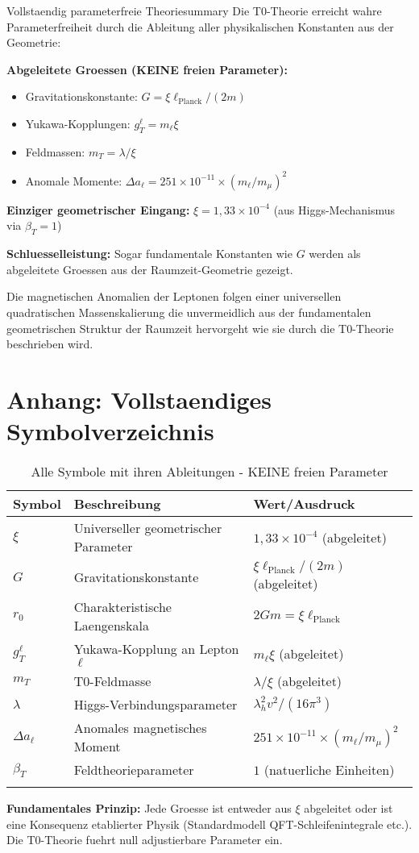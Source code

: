 \documentclass[12pt,a4paper]{article}
\begin{document}
	\begin{keyresult}{Vollstaendig parameterfreie Theorie}{summary}
		Die T0-Theorie erreicht wahre Parameterfreiheit durch die Ableitung aller physikalischen Konstanten aus der Geometrie:
		
		\textbf{Abgeleitete Groessen (KEINE freien Parameter):}
		\begin{itemize}
			\item Gravitationskonstante: $G = \xi \ell_{\text{Planck}}/(2m)$
			\item Yukawa-Kopplungen: $g_T^\ell = m_\ell \xi$  
			\item Feldmassen: $m_T = \lambda/\xi$
			\item Anomale Momente: $\Delta a_\ell = 251 \times 10^{-11} \times (m_\ell/m_\mu)^2$
		\end{itemize}
		
		\textbf{Einziger geometrischer Eingang:}
		$\xi = 1{,}33 \times 10^{-4}$ (aus Higgs-Mechanismus via $\beta_T = 1$)
		
		\textbf{Schluesselleistung:} Sogar fundamentale Konstanten wie $G$ werden als abgeleitete Groessen aus der Raumzeit-Geometrie gezeigt.
	\end{keyresult}
	
	Die magnetischen Anomalien der Leptonen folgen einer universellen quadratischen Massenskalierung die unvermeidlich aus der fundamentalen geometrischen Struktur der Raumzeit hervorgeht wie sie durch die T0-Theorie beschrieben wird.
	
	\newpage
	\section*{Anhang: Vollstaendiges Symbolverzeichnis}
	
	\begin{longtable}{p{2.5cm} p{8cm} p{4.5cm}}
		\toprule
		\textbf{Symbol} & \textbf{Beschreibung} & \textbf{Wert/Ausdruck} \\
		\midrule
		\endhead
		$\xi$ & Universeller geometrischer Parameter & $1{,}33 \times 10^{-4}$ (abgeleitet) \\
		$G$ & Gravitationskonstante & $\xi \ell_{\text{Planck}}/(2m)$ (abgeleitet) \\
		$r_0$ & Charakteristische Laengenskala & $2Gm = \xi \ell_{\text{Planck}}$ \\
		$g_T^\ell$ & Yukawa-Kopplung an Lepton $\ell$ & $m_\ell \xi$ (abgeleitet) \\
		$m_T$ & T0-Feldmasse & $\lambda/\xi$ (abgeleitet) \\
		$\lambda$ & Higgs-Verbindungsparameter & $\lambda_h^2 v^2/(16\pi^3)$ \\
		$\Delta a_\ell$ & Anomales magnetisches Moment & $251 \times 10^{-11} \times (m_\ell/m_\mu)^2$ \\
		$\beta_T$ & Feldtheorieparameter & $1$ (natuerliche Einheiten) \\
		\bottomrule
		\caption{Alle Symbole mit ihren Ableitungen - KEINE freien Parameter}
	\end{longtable}
	
	\textbf{Fundamentales Prinzip:} Jede Groesse ist entweder aus $\xi$ abgeleitet oder ist eine Konsequenz etablierter Physik (Standardmodell QFT-Schleifenintegrale etc.). Die T0-Theorie fuehrt null adjustierbare Parameter ein.
	
\end{document}
